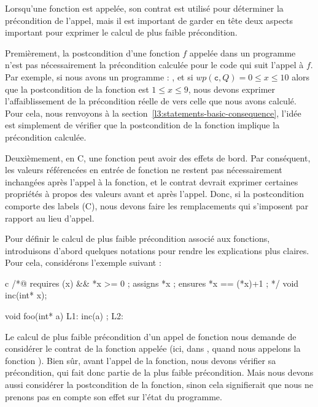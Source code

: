 

Lorsqu'une fonction est appelée, son contrat est utilisé pour
déterminer la précondition de l'appel, mais il est important de garder en tête deux
aspects important pour exprimer le calcul de plus faible précondition.


Premièrement, la postcondition d'une fonction $f$ appelée dans un
programme n'est pas nécessairement la précondition calculée pour le code
qui suit l'appel à $f$. Par exemple, si nous avons un programme :
, et si $wp(\texttt{c}, Q) = 0 \leq x \leq 10$ alors que
la postcondition de la fonction  est $1 \leq x \leq 9$, nous devons
exprimer l'affaiblissement de la précondition réelle de 
vers celle que nous avons calculé. Pour cela, nous renvoyons à la
section~\ref{l3:statements-basic-consequence}, l'idée est simplement de vérifier
que la postcondition de la fonction implique la précondition calculée.



Deuxièmement, en C, une fonction peut avoir des effets de bord. Par conséquent, les
valeurs référencées en entrée de fonction ne restent pas nécessairement inchangées
après l'appel à la fonction, et le contrat devrait exprimer certaines propriétés à
propos des valeurs avant et après l'appel. Donc, si la postcondition comporte des
labels (C), nous devons faire les remplacements qui s'imposent par rapport au
lieu d'appel.



Pour définir le calcul de plus faible précondition associé aux fonctions, introduisons
d'abord quelques notations pour rendre les explications plus claires. Pour cela,
considérons l'exemple suivant :

\begin{CodeBlock}{c}
/*@ requires \valid(x) && *x >= 0 ;
    assigns *x ;
    ensures *x == \old(*x)+1 ; */
void inc(int* x);

void foo(int* a){
  L1:
  inc(a) ;
  L2:
}
\end{CodeBlock}


Le calcul de plus faible précondition d'un appel de fonction nous demande de
considérer le contrat de la fonction appelée (ici, dans , quand
nous appelons la fonction ). Bien sûr, avant l'appel de la fonction,
nous devons vérifier sa précondition, qui fait donc partie de la plus faible
précondition. Mais nous devons aussi considérer la postcondition de la fonction,
sinon cela signifierait que nous ne prenons pas en compte son effet sur l'état du
programme.


